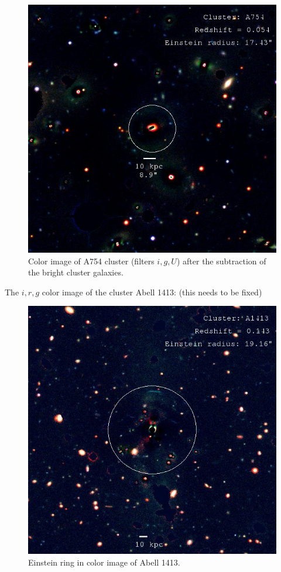 \begin{figure}[H]
\centering
\includegraphics[width=12cm]{images/cA754_galfit.jpg}
\caption[Color image of A754 after fitting the bright objects]{Color image of A754 cluster (filters $i,g,U$) after the subtraction of the bright cluster galaxies.}
\end{figure}

The $i,r,g$ color image of the cluster Abell 1413: (this needs to be fixed)

\begin{figure}[H]
\centering
\includegraphics[width=15cm]{images/A1413_ring.jpg}
\caption[Einstein ring in color image of A1413]{Einstein ring in color image of Abell 1413.}
\end{figure}

